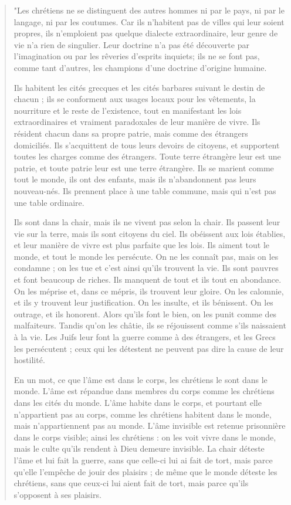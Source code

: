 \begin{quote}
"Les chrétiens ne se distinguent des autres hommes ni par le pays, ni par le langage, ni par les coutumes. Car ils n’habitent pas de villes qui leur soient propres, ils n’emploient pas quelque dialecte extraordinaire, leur genre de vie n’a rien de singulier. Leur doctrine n’a pas été découverte par l’imagination ou par les rêveries d’esprits inquiets; ils ne se font pas, comme tant d’autres, les champions d’une doctrine d’origine humaine. 

Ils habitent les cités grecques et les cités barbares suivant le destin de chacun ; ils se conforment aux usages locaux pour les vêtements, la nourriture et le reste de l’existence, tout en manifestant les lois extraordinaires et vraiment paradoxales de leur manière de vivre. Ils résident chacun dans sa propre patrie, mais comme des étrangers domiciliés. Ils s’acquittent de tous leurs devoirs de citoyens, et supportent toutes les charges comme des étrangers. Toute terre étrangère leur est une patrie, et toute patrie leur est une terre étrangère. Ils se marient comme tout le monde, ils ont des enfants, mais ils n’abandonnent pas leurs nouveau-nés. Ils prennent place à une table commune, mais qui n’est pas une table ordinaire.

Ils sont dans la chair, mais ils ne vivent pas selon la chair. Ils passent leur vie sur la terre, mais ils sont citoyens du ciel. Ils obéissent aux lois établies, et leur manière de vivre est plus parfaite que les lois. Ils aiment tout le monde, et tout le monde les persécute. On ne les connaît pas, mais on les condamne ; on les tue et c’est ainsi qu’ils trouvent la vie. Ils sont pauvres et font beaucoup de riches. Ils manquent de tout et ils tout en abondance. On les méprise et, dans ce mépris, ils trouvent leur gloire. On les calomnie, et ils y trouvent leur justification. On les insulte, et ils bénissent. On les outrage, et ils honorent. Alors qu’ils font le bien, on les punit comme des malfaiteurs. Tandis qu’on les châtie, ils se réjouissent comme s’ils naissaient à la vie. Les Juifs leur font la guerre comme à des étrangers, et les Grecs les persécutent ; ceux qui les détestent ne peuvent pas dire la cause de leur hostilité.

En un mot, ce que l’âme est dans le corps, les chrétiens le sont dans le monde. L’âme est répandue dans membres du corps comme les chrétiens dans les cités du monde. L’âme habite dans le corps, et pourtant elle n’appartient pas au corps, comme les chrétiens habitent dans le monde, mais n’appartiennent pas au monde. L’âme invisible est retenue prisonnière dans le corps visible; ainsi les chrétiens : on les voit vivre dans le monde, mais le culte qu’ils rendent à Dieu demeure invisible. La chair déteste l’âme et lui fait la guerre, sans que celle-ci lui ai fait de tort, mais parce qu’elle l’empêche de jouir des plaisirs ; de même que le monde déteste les chrétiens, sans que ceux-ci lui aient fait de tort, mais parce qu’ils s’opposent à ses plaisirs.


\end{quote}
